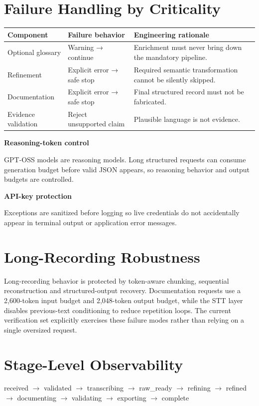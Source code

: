 \documentclass[9pt,a4paper]{extarticle}
\newcommand{\twocard}[4]{%
\begin{minipage}[t]{0.48\textwidth}\begin{card}\textbf{#1}\par #2\end{card}\end{minipage}\hfill%
\begin{minipage}[t]{0.48\textwidth}\begin{card}\textbf{#3}\par #4\end{card}\end{minipage}}
\begin{document}
\section*{Failure Handling by Criticality}
\begin{center}
\begin{tabularx}{0.94\textwidth}{@{}l X X@{}}
\toprule
\textbf{Component} & \textbf{Failure behavior} & \textbf{Engineering rationale}\\
\midrule
Optional glossary & Warning → continue & Enrichment must never bring down the mandatory pipeline.\\
Refinement & Explicit error → safe stop & Required semantic transformation cannot be silently skipped.\\
Documentation & Explicit error → safe stop & Final structured record must not be fabricated.\\
Evidence validation & Reject unsupported claim & Plausible language is not evidence.\\
\bottomrule
\end{tabularx}
\end{center}

\vspace{4pt}
\twocard{Reasoning-token control}{GPT-OSS models are reasoning models. Long structured requests can consume generation budget before valid JSON appears, so reasoning behavior and output budgets are controlled.}{API-key protection}{\small Exceptions are sanitized before logging so live credentials do not accidentally appear in terminal output or application error messages.}

\vspace{4pt}
\section*{Long-Recording Robustness}
\begin{card}
Long-recording behavior is protected by token-aware chunking, sequential reconstruction and structured-output recovery. Documentation requests use a 2,600-token input budget and 2,048-token output budget, while the STT layer disables previous-text conditioning to reduce repetition loops. The current verification set explicitly exercises these failure modes rather than relying on a single oversized request.
\end{card}

\vspace{4pt}
\section*{Stage-Level Observability}
\begin{card}
\centering\ttfamily\small
received $\rightarrow$ validated $\rightarrow$ transcribing $\rightarrow$ raw\_ready $\rightarrow$ refining $\rightarrow$ refined $\rightarrow$ documenting $\rightarrow$ validating $\rightarrow$ exporting $\rightarrow$ complete
\end{card}
\end{document}

